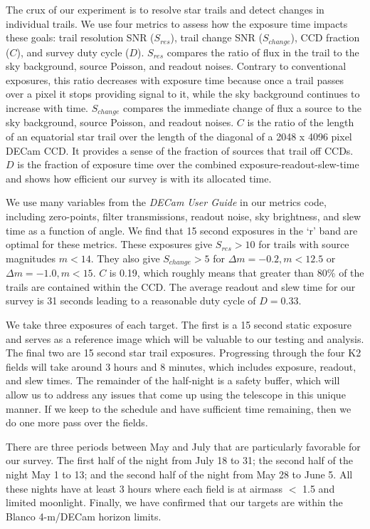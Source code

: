 \documentclass[11pt]{article}
\begin{document}
The crux of our experiment is to resolve star trails and detect changes in individual trails. We use four metrics to assess how the exposure time impacts these goals: trail resolution SNR ($S_{res}$), trail change SNR ($S_{change}$), CCD fraction ($C$), and survey duty cycle ($D$). $S_{res}$ compares the ratio of flux in the trail to the sky background, source Poisson, and readout noises. Contrary to conventional exposures, this ratio decreases with exposure time because once a trail passes over a pixel it stops providing signal to it, while the sky background continues to increase with time. $S_{change}$ compares the immediate change of flux a source to the sky background, source Poisson, and readout noises. $C$ is the ratio of the length of an equatorial star trail over the length of the diagonal of a 2048 x 4096 pixel DECam CCD. It provides a sense of the fraction of sources that trail off CCDs. $D$ is the fraction of exposure time over the combined exposure-readout-slew-time and shows how efficient our survey is with its allocated time.

We use many variables from the \textit{DECam User Guide} in our metrics code, including zero-points, filter transmissions, readout noise, sky brightness, and slew time as a function of angle. We find that 15 second exposures in the `r' band are optimal for these metrics. These exposures give $S_{res} > 10$ for trails with source magnitudes $m < 14$. They also give $S_{change} > 5$ for $\Delta m = -0.2, m < 12.5$ or $\Delta m = -1.0, m < 15$. $C$ is 0.19, which roughly means that greater than 80\% of the trails are contained within the CCD. The average readout and slew time for our survey is 31 seconds leading to a reasonable duty cycle of $D = 0.33$.

We take three exposures of each target. The first is a 15 second static exposure and serves as a reference image which will be valuable to our testing and analysis. The final two are 15 second star trail exposures. Progressing through the four K2 fields will take around 3 hours and 8 minutes, which includes exposure, readout, and slew times. The remainder of the half-night is a safety buffer, which will allow us to address any issues that come up using the telescope in this unique manner. If we keep to the schedule and have sufficient time remaining, then we do one more pass over the fields.

There are three periods between May and July that are particularly favorable for our survey. The first half of the night from July 18 to 31; the second half of the night May 1 to 13; and the second half of the night from May 28 to June 5. All these nights have at least 3 hours where each field is at airmass $<$ 1.5 and limited moonlight. Finally, we have confirmed that our targets are within the Blanco 4-m/DECam horizon limits.
\end{document}
